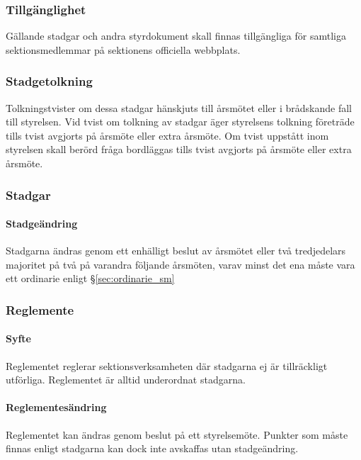 \documentclass{dgovdoc}
\begin{document}
\subsubsection{Tillgänglighet}

Gällande stadgar och andra styrdokument skall finnas tillgängliga för samtliga
sektionsmedlemmar på sektionens officiella webbplats.

\subsubsection{Stadgetolkning}

Tolkningstvister om dessa stadgar hänskjuts till årsmötet 
eller i brådskande fall till styrelsen. Vid tvist om tolkning av stadgar 
äger styrelsens tolkning företräde tills tvist avgjorts 
på årsmöte eller extra årsmöte. Om tvist uppstått inom 
styrelsen skall berörd fråga bordläggas tills tvist 
avgjorts på årsmöte eller extra årsmöte.

\subsubsection{Stadgar}

\paragraph{Stadgeändring}

Stadgarna ändras genom ett enhälligt beslut av årsmötet eller
två tredjedelars majoritet på två på varandra följande årsmöten, varav
minst det ena måste vara ett ordinarie enligt \S\ref{sec:ordinarie_sm}

\subsubsection{Reglemente}

\paragraph{Syfte}

Reglementet reglerar sektionsverksamheten där stadgarna ej är tillräckligt
utförliga. Reglementet är alltid underordnat stadgarna.

\paragraph{Reglementesändring}

Reglementet kan ändras genom beslut på ett styrelsemöte. Punkter som måste finnas enligt
stadgarna kan dock inte avskaffas utan stadgeändring.
\end{document}
